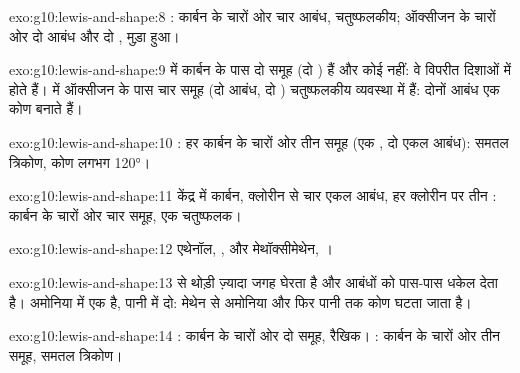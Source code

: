 \begin{solution}{exo:g10:lewis-and-shape:8}
: कार्बन के चारों ओर चार आबंध,
चतुष्फलकीय; ऑक्सीजन के चारों ओर दो आबंध और दो , मुड़ा हुआ।
\end{solution}

\begin{solution}{exo:g10:lewis-and-shape:9}
 में कार्बन के पास दो समूह (दो ) हैं और कोई  नहीं: वे
विपरीत दिशाओं में होते हैं।  में ऑक्सीजन के पास चार समूह (दो
आबंध, दो ) चतुष्फलकीय व्यवस्था में हैं: दोनों आबंध एक कोण
बनाते हैं।
\end{solution}

\begin{solution}{exo:g10:lewis-and-shape:10}
: हर कार्बन के चारों ओर तीन
समूह (एक , दो एकल आबंध): समतल त्रिकोण, कोण लगभग
\ang{120}।
\end{solution}

\begin{solution}{exo:g10:lewis-and-shape:11}
केंद्र में कार्बन, क्लोरीन  से चार एकल आबंध, हर क्लोरीन पर तीन
: कार्बन के चारों ओर चार समूह, एक चतुष्फलक।
\end{solution}

\begin{solution}{exo:g10:lewis-and-shape:12}
एथेनॉल, , और
मेथॉक्सीमेथेन,
।
\end{solution}

\begin{solution}{exo:g10:lewis-and-shape:13}
  से थोड़ी ज़्यादा जगह घेरता है और आबंधों को पास-पास धकेल
देता है। अमोनिया में एक  है, पानी में दो: मेथेन से अमोनिया और फिर पानी तक
कोण घटता जाता है।
\end{solution}

\begin{solution}{exo:g10:lewis-and-shape:14}
: कार्बन के चारों ओर दो समूह, रैखिक।
: कार्बन के चारों ओर तीन समूह, समतल
त्रिकोण।
\end{solution}

